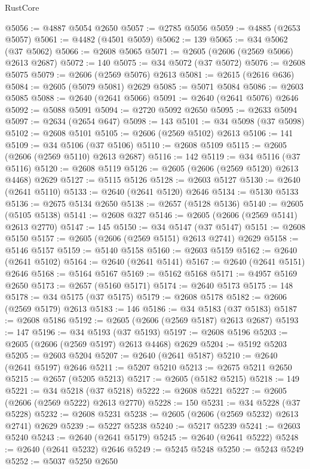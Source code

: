 \begin{lexlean}{RustCore}
\begin{coremodule}
@5056 := @4887 @5054 @2650
@5057 := @2785 @5056
@5059 := @4885 (@2653 @5057)
@5061 := @4482 (@4501 @5059)
@5062 := 139
@5065 := @34 @5062 (@37 @5062)
@5066 := @2608 @5065
@5071 := @2605 (@2606 (@2569 @5066) @2613 @2687)
@5072 := 140
@5075 := @34 @5072 (@37 @5072)
@5076 := @2608 @5075
@5079 := @2606 (@2569 @5076) @2613
@5081 := @2615 (@2616 @636)
@5084 := @2605 (@5079 @5081) @2629
@5085 := @5071 @5084
@5086 := @2603 @5085
@5088 := @2640 (@2641 @5066)
@5091 := @2640 (@2641 @5076) @2646
@5092 := @5088 @5091
@5094 := @2720 @5092 @2650
@5095 := @2633 @5094
@5097 := @2634 (@2654 @647)
@5098 := 143
@5101 := @34 @5098 (@37 @5098)
@5102 := @2608 @5101
@5105 := @2606 (@2569 @5102) @2613
@5106 := 141
@5109 := @34 @5106 (@37 @5106)
@5110 := @2608 @5109
@5115 := @2605 (@2606 (@2569 @5110) @2613 @2687)
@5116 := 142
@5119 := @34 @5116 (@37 @5116)
@5120 := @2608 @5119
@5126 := @2605 (@2606 (@2569 @5120) @2613 @4468) @2629
@5127 := @5115 @5126
@5128 := @2603 @5127
@5130 := @2640 (@2641 @5110)
@5133 := @2640 (@2641 @5120) @2646
@5134 := @5130 @5133
@5136 := @2675 @5134 @2650
@5138 := @2657 (@5128 @5136)
@5140 := @2605 (@5105 @5138)
@5141 := @2608 @327
@5146 := @2605 (@2606 (@2569 @5141) @2613 @2770)
@5147 := 145
@5150 := @34 @5147 (@37 @5147)
@5151 := @2608 @5150
@5157 := @2605 (@2606 (@2569 @5151) @2613 @2741) @2629
@5158 := @5146 @5157
@5159 := @5140 @5158
@5160 := @2603 @5159
@5162 := @2640 (@2641 @5102)
@5164 := @2640 (@2641 @5141)
@5167 := @2640 (@2641 @5151) @2646
@5168 := @5164 @5167
@5169 := @5162 @5168
@5171 := @4957 @5169 @2650
@5173 := @2657 (@5160 @5171)
@5174 := @2640 @5173
@5175 := 148
@5178 := @34 @5175 (@37 @5175)
@5179 := @2608 @5178
@5182 := @2606 (@2569 @5179) @2613
@5183 := 146
@5186 := @34 @5183 (@37 @5183)
@5187 := @2608 @5186
@5192 := @2605 (@2606 (@2569 @5187) @2613 @2687)
@5193 := 147
@5196 := @34 @5193 (@37 @5193)
@5197 := @2608 @5196
@5203 := @2605 (@2606 (@2569 @5197) @2613 @4468) @2629
@5204 := @5192 @5203
@5205 := @2603 @5204
@5207 := @2640 (@2641 @5187)
@5210 := @2640 (@2641 @5197) @2646
@5211 := @5207 @5210
@5213 := @2675 @5211 @2650
@5215 := @2657 (@5205 @5213)
@5217 := @2605 (@5182 @5215)
@5218 := 149
@5221 := @34 @5218 (@37 @5218)
@5222 := @2608 @5221
@5227 := @2605 (@2606 (@2569 @5222) @2613 @2770)
@5228 := 150
@5231 := @34 @5228 (@37 @5228)
@5232 := @2608 @5231
@5238 := @2605 (@2606 (@2569 @5232) @2613 @2741) @2629
@5239 := @5227 @5238
@5240 := @5217 @5239
@5241 := @2603 @5240
@5243 := @2640 (@2641 @5179)
@5245 := @2640 (@2641 @5222)
@5248 := @2640 (@2641 @5232) @2646
@5249 := @5245 @5248
@5250 := @5243 @5249
@5252 := @5037 @5250 @2650

\end{coremodule}
\end{lexlean}
